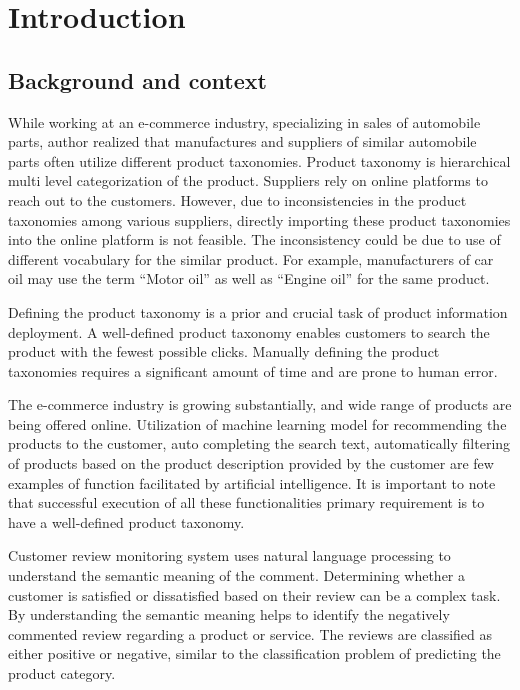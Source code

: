 \chapter{Introduction}

\section{Background and context}

While working at an e-commerce industry, specializing in sales of automobile parts, author realized that manufactures and suppliers of similar automobile parts often utilize different product taxonomies. Product taxonomy is hierarchical multi level categorization of the product.  Suppliers rely on online platforms to reach out to the customers. However, due to inconsistencies in the product taxonomies among various suppliers, directly importing these product taxonomies into the online platform is not feasible. The inconsistency could be due to use of different vocabulary for the similar product. For example, manufacturers of car oil may use the term ``Motor oil'' as well as ``Engine oil'' for the same product. 

Defining the product taxonomy is a prior and crucial task of product information deployment. A well-defined product taxonomy enables customers to search the product with the fewest possible clicks.  Manually defining the product taxonomies requires a significant amount of time and are prone to human error. 

The e-commerce industry is growing substantially, and wide range of products are being offered online. Utilization of machine learning model for recommending the products to the customer, auto completing the search text, automatically filtering of products based on the product description provided by the customer are few examples of function facilitated by artificial intelligence. It is important to note that successful execution of all these functionalities primary requirement is to have a well-defined product taxonomy.

 Customer review monitoring system uses natural language processing to understand the semantic meaning of the comment. Determining whether a customer is satisfied or dissatisfied based on their review can be a complex task. By understanding the semantic meaning helps to identify the negatively commented review regarding a product or service. The reviews are classified as either positive or negative, similar to the classification problem of predicting the product category. 
 
